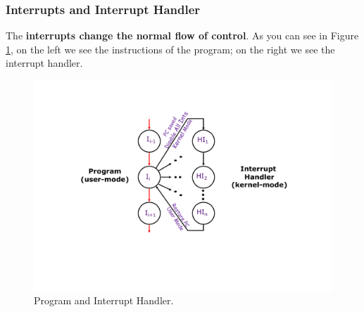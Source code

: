 \subsubsection{Interrupts and Interrupt Handler}

The \textbf{interrupts change the normal flow of control}. As you can see in Figure \ref{fig: Program and Interrupt Handler}, on the left we see the instructions of the program; on the right we see the interrupt handler.

\begin{figure}[!htp]
    \centering
    \includegraphics[width=.8\textwidth]{img/interrupts-1.pdf}
    \caption{Program and Interrupt Handler.}
    \label{fig: Program and Interrupt Handler}
\end{figure}

